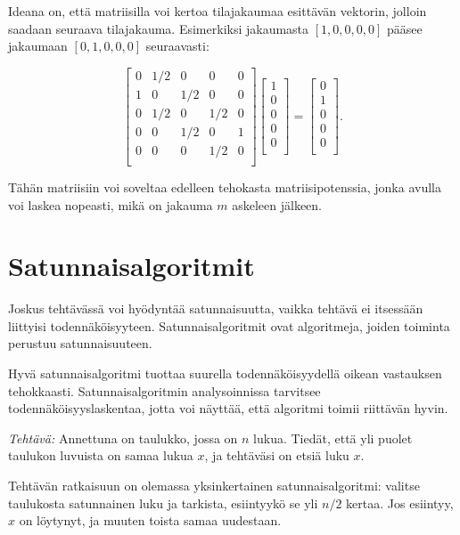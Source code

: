 Ideana on, että matriisilla voi kertoa tilajakaumaa esittävän
vektorin, jolloin saadaan seuraava tilajakauma.
Esimerkiksi jakaumasta $[1,0,0,0,0]$ pääsee jakaumaan
$[0,1,0,0,0]$ seuraavasti:

\[ 
 \begin{bmatrix}
  0 & 1/2 & 0 & 0 & 0 \\
  1 & 0 & 1/2 & 0 & 0 \\
  0 & 1/2 & 0 & 1/2 & 0 \\
  0 & 0 & 1/2 & 0 & 1 \\
  0 & 0 & 0 & 1/2 & 0 \\
 \end{bmatrix}
 \begin{bmatrix}
  1 \\
  0 \\
  0 \\
  0 \\
  0 \\
 \end{bmatrix}
=
 \begin{bmatrix}
  0 \\
  1 \\
  0 \\
  0 \\
  0 \\
 \end{bmatrix}.
\]

Tähän matriisiin voi soveltaa edelleen tehokasta
matriisipotenssia, jonka avulla voi laskea nopeasti,
mikä on jakauma $m$ askeleen jälkeen.

\section{Satunnaisalgoritmit}

Joskus tehtävässä voi hyödyntää satunnaisuutta,
vaikka tehtävä ei itsessään liittyisi todennäköisyyteen.
Satunnaisalgoritmit ovat algoritmeja, joiden toiminta
perustuu satunnaisuuteen.

Hyvä satunnaisalgoritmi tuottaa suurella todennäköisyydellä
oikean vastauksen tehokkaasti.
Satunnaisalgoritmin analysoinnissa tarvitsee
todennäköisyyslaskentaa, jotta voi näyttää,
että algoritmi toimii riittävän hyvin.

\textit{Tehtävä:} Annettuna on taulukko, jossa on $n$ lukua.
Tiedät, että yli puolet taulukon luvuista on samaa lukua $x$,
ja tehtäväsi on etsiä luku $x$.

Tehtävän ratkaisuun on olemassa yksinkertainen
satunnaisalgoritmi: valitse taulukosta satunnainen luku
ja tarkista, esiintyykö se yli $n/2$ kertaa.
Jos esiintyy, $x$ on löytynyt, ja muuten toista samaa uudestaan.

